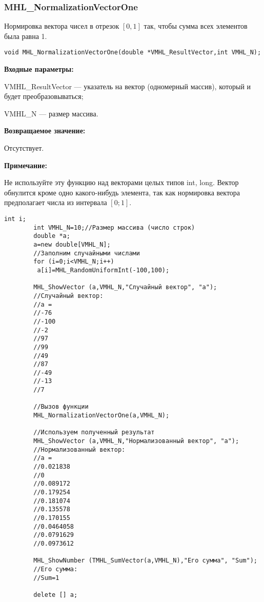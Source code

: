 \documentclass[a4paper,12pt]{article}
\begin{document}
\subsubsection{MHL\_NormalizationVectorOne}\label{MHL_NormalizationVectorOne}

Нормировка вектора чисел в отрезок $[0,1]$ так, чтобы сумма всех элементов была равна 1.


\begin{lstlisting}[label=code_syntax_MHL_NormalizationVectorOne,caption=Синтаксис]
void MHL_NormalizationVectorOne(double *VMHL_ResultVector,int VMHL_N);
\end{lstlisting}

\textbf{Входные параметры:}

 VMHL\_ResultVector --- указатель на вектор (одномерный массив), который и будет преобразовываться;
 
 VMHL\_N --- размер массива.

\textbf{Возвращаемое значение:} 
 
Отсутствует.

\textbf{Примечание:} 

Не используйте эту функцию над векторами целых типов int, long. Вектор обнулится кроме одно какого-нибудь элемента, так как нормировка вектора предполагает числа из интервала $[0;1]$.


\begin{lstlisting}[label=code_use_MHL_NormalizationVectorOne,caption=Пример использования]
        int i;
        int VMHL_N=10;//Размер массива (число строк)
        double *a;
        a=new double[VMHL_N];
        //Заполним случайными числами
        for (i=0;i<VMHL_N;i++)
         a[i]=MHL_RandomUniformInt(-100,100);

        MHL_ShowVector (a,VMHL_N,"Случайный вектор", "a");
        //Случайный вектор:
        //a =
        //-76
        //-100
        //-2
        //97
        //99
        //49
        //87
        //-49
        //-13
        //7

        //Вызов функции
        MHL_NormalizationVectorOne(a,VMHL_N);

        //Используем полученный результат
        MHL_ShowVector (a,VMHL_N,"Нормализованный вектор", "a");
        //Нормализованный вектор:
        //a =
        //0.021838
        //0
        //0.089172
        //0.179254
        //0.181074
        //0.135578
        //0.170155
        //0.0464058
        //0.0791629
        //0.0973612

        MHL_ShowNumber (TMHL_SumVector(a,VMHL_N),"Его сумма", "Sum");
        //Его сумма:
        //Sum=1

        delete [] a;
\end{lstlisting}
\end{document}
